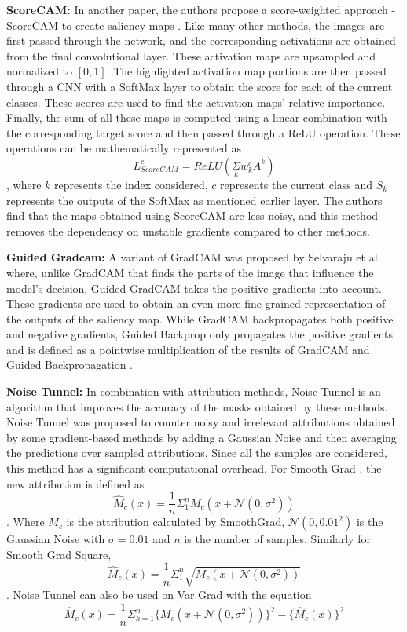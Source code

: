 \textbf{ScoreCAM: }
In another paper, the authors propose a score-weighted approach - ScoreCAM to create saliency maps \cite{wangScoreCAMScoreWeightedVisual2020}. Like many other methods, the images are first passed through the network, and the corresponding activations are obtained from the final convolutional layer. These activation maps are upsampled and normalized to $[0,1]$. The highlighted activation map portions are then passed through a CNN with a SoftMax layer to obtain the score for each of the current classes. These scores are used to find the activation maps' relative importance. Finally, the sum of all these maps is computed using a linear combination with the corresponding target score and then passed through a ReLU operation. These operations can be mathematically represented as $$L^{c}_{ScoreCAM} = ReLU(\underset{k}\Sigma w_{k}^{c}A^{k})$$, where $k$ represents the index considered, $c$ represents the current class and $S_k$ represents the outputs of the SoftMax as mentioned earlier layer. The authors find that the maps obtained using ScoreCAM are less noisy, and this method removes the dependency on unstable gradients compared to other methods.

\textbf{Guided Gradcam: }
A variant of GradCAM \cite{selvarajuGradCAMVisualExplanations} was proposed by Selvaraju et al. \cite{selvarajuGradCAMWhyDid2017} where, unlike GradCAM that finds the parts of the image that influence the model's decision, Guided GradCAM takes the positive gradients into account. These gradients are used to obtain an even more fine-grained representation of the outputs of the saliency map. While GradCAM backpropagates both positive and negative gradients, Guided Backprop only propagates the positive gradients and is defined as a pointwise multiplication of the results of GradCAM and Guided Backpropagation \cite{springenbergStrivingSimplicityAll2015}.

\textbf{Noise Tunnel: }
In combination with attribution methods, Noise Tunnel \cite{kokhlikyanCaptumUnifiedGeneric2020} is an algorithm that improves the accuracy of the masks obtained by these methods. Noise Tunnel was proposed to counter noisy and irrelevant attributions obtained by some gradient-based methods by adding a Gaussian Noise and then averaging the predictions over sampled attributions. Since all the samples are considered, this method has a significant computational overhead. For Smooth Grad \cite{smilkovSmoothGradRemovingNoise2017}, the new attribution is defined as $$\hat M_{c}(x) = \frac{1}{n}\Sigma_{1}^{n}M_{c}(x + \mathcal{N}(0, \sigma^{2}))$$. Where $M_{c}$ is the attribution calculated by SmoothGrad, $\mathcal {N}(0, 0.01^2)$ is the Gaussian Noise with $\sigma = 0.01$ and $n$ is the number of samples. Similarly for Smooth Grad Square, $$\hat M_{c}(x) = \frac{1}{n}\Sigma_{1}^{n}\sqrt{M_{c}(x + \mathcal{N}(0, \sigma^{2}))}$$. Noise Tunnel can also be used on Var Grad \cite{richterVarGradLowVarianceGradient2020} with the equation $$\hat M_{c}(x) = \frac{1}{n}\Sigma_{k=1}^{n}\{M_{c}(x + \mathcal{N}(0, \sigma^{2}))\}^{2}- \{\hat M_{c}(x)\}^{2}$$

